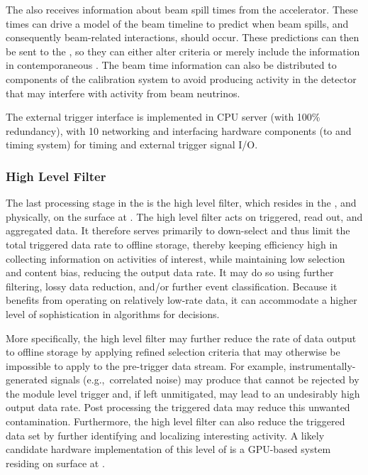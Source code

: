 The  also receives information about beam spill times from the accelerator.
These times can drive a model of the beam timeline to predict when
beam spills, and consequently beam-related interactions, should occur. 
These predictions can then be sent to the , so they
can either alter  criteria or merely include the
information in contemporaneous . The beam time information can also be distributed to components of the calibration system to avoid producing activity in the detector that may interfere with activity from beam neutrinos.

The external trigger interface is implemented in  CPU server (with 100\%
redundancy), with \SI{10}{\Gbps} networking and interfacing hardware
components (to  and  timing system) for timing and external trigger signal I/O.

\subsubsection{High Level Filter}
\label{sec:daq:design-data-reduction}

The last processing stage in the  is the
high level filter, which resides in the , and physically,
on the surface at .
The high level filter acts on triggered, read out, and aggregated data. 
It therefore serves primarily to down-select and thus
limit the total triggered data rate to offline storage, thereby keeping 
efficiency high in collecting information on activities of interest,
while maintaining low selection and content bias, reducing the output data
rate. It may do so using 
further filtering, lossy data reduction, and/or further event
classification.
Because it benefits from operating on relatively low-rate data, it can accommodate a higher level of
sophistication in algorithms for  decisions.

More specifically, the high level filter may further reduce the rate of data output to offline storage by
applying refined selection criteria that may otherwise be impossible
to apply to the pre-trigger data stream.  For example, instrumentally-generated signals (e.g.,~correlated noise)
may produce  that cannot be rejected by the module
level trigger and, if left unmitigated, may lead to an undesirably high
output data rate. 
Post processing the triggered data may reduce this unwanted
contamination.
Furthermore, the high level filter can also reduce the triggered data set by further identifying
and localizing interesting activity. A likely candidate hardware
implementation of this level of  is a GPU-based system
residing on surface at .

